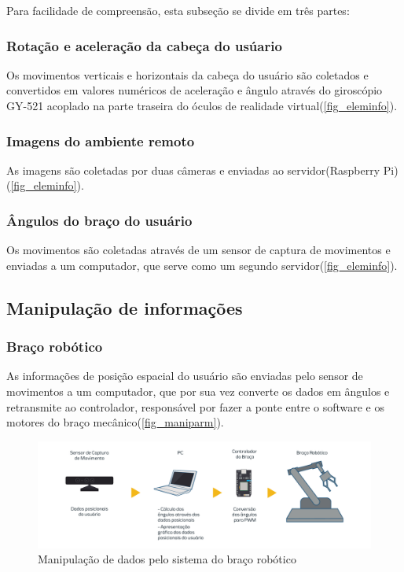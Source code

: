 	Para facilidade de compreensão, esta subseção se divide em três partes:
	\subsubsection{Rotação e aceleração da cabeça do usúario}\label{subsubsec-elementos-info-rotation}
	Os movimentos verticais e horizontais da cabeça do usuário são coletados e convertidos em valores numéricos de aceleração e ângulo através do giroscópio GY-521 acoplado na parte traseira do óculos de realidade virtual(\autoref{fig_eleminfo}).
	 
	\subsubsection{Imagens do ambiente remoto}\label{subsubsec-elementos-info-images}	
	As imagens são coletadas por duas câmeras e enviadas ao servidor(Raspberry Pi)(\autoref{fig_eleminfo}). 	

	\subsubsection{Ângulos do braço do usuário}\label{subsubsec-elementos-info-angles}	
	 Os movimentos são coletadas através de um sensor de captura de movimentos e enviadas a um computador, que serve como um segundo servidor(\autoref{fig_eleminfo}).
	\subsection{Manipulação de informações}\label{subsec-manip-info}

	\subsubsection{Braço robótico}\label{subsubsec-elementos-manip-arm}		
	As informações de posição espacial do usuário são enviadas pelo sensor de movimentos a um computador, que por sua vez converte os dados em ângulos e retransmite ao controlador, responsável por fazer a ponte entre o software e os motores do braço mecânico(\autoref{fig_maniparm}).
		\begin{figure}[h!]
		\caption{\label{fig_maniparm}  Manipulação de dados pelo sistema do braço robótico}
		\begin{center}
			\includegraphics[width=\textwidth]{maniparm.pdf}	
		\end{center}
	\end{figure}
	
